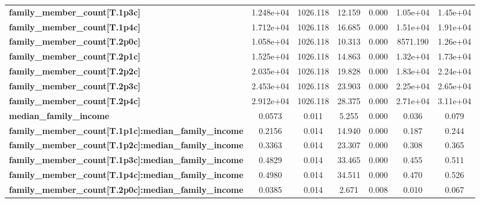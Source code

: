 \documentclass{report}
\begin{document}
\begin{center}
\begin{tabular}{lcccccc}
\textbf{family\_member\_count[T.1p3c]}                        &    1.248e+04  &     1026.118     &    12.159  &         0.000        &     1.05e+04    &     1.45e+04     \\
\textbf{family\_member\_count[T.1p4c]}                        &    1.712e+04  &     1026.118     &    16.685  &         0.000        &     1.51e+04    &     1.91e+04     \\
\textbf{family\_member\_count[T.2p0c]}                        &    1.058e+04  &     1026.118     &    10.313  &         0.000        &     8571.190    &     1.26e+04     \\
\textbf{family\_member\_count[T.2p1c]}                        &    1.525e+04  &     1026.118     &    14.863  &         0.000        &     1.32e+04    &     1.73e+04     \\
\textbf{family\_member\_count[T.2p2c]}                        &    2.035e+04  &     1026.118     &    19.828  &         0.000        &     1.83e+04    &     2.24e+04     \\
\textbf{family\_member\_count[T.2p3c]}                        &    2.453e+04  &     1026.118     &    23.903  &         0.000        &     2.25e+04    &     2.65e+04     \\
\textbf{family\_member\_count[T.2p4c]}                        &    2.912e+04  &     1026.118     &    28.375  &         0.000        &     2.71e+04    &     3.11e+04     \\
\textbf{median\_family\_income}                               &       0.0573  &        0.011     &     5.255  &         0.000        &        0.036    &        0.079     \\
\textbf{family\_member\_count[T.1p1c]:median\_family\_income} &       0.2156  &        0.014     &    14.940  &         0.000        &        0.187    &        0.244     \\
\textbf{family\_member\_count[T.1p2c]:median\_family\_income} &       0.3363  &        0.014     &    23.307  &         0.000        &        0.308    &        0.365     \\
\textbf{family\_member\_count[T.1p3c]:median\_family\_income} &       0.4829  &        0.014     &    33.465  &         0.000        &        0.455    &        0.511     \\
\textbf{family\_member\_count[T.1p4c]:median\_family\_income} &       0.4980  &        0.014     &    34.511  &         0.000        &        0.470    &        0.526     \\
\textbf{family\_member\_count[T.2p0c]:median\_family\_income} &       0.0385  &        0.014     &     2.671  &         0.008        &        0.010    &        0.067     \\

\end{tabular}
\end{center}
\end{document}
